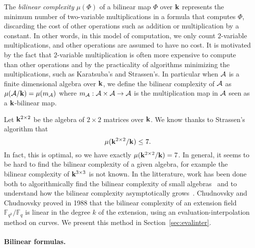 The \emph{bilinear complexity}
$\mu(\Phi)$ of a bilinear map $\Phi$ over $\mathbf{k}$ represents the minimum number of two-variable
multiplications in a formula that computes $\Phi$, discarding the cost of other
operations such as addition or multiplication by a constant. In other words, in
this model of computation, we only count $2$-variable multiplications, and other
operations are assumed to have no cost. It is motivated by the fact that
$2$-variable multiplication is often more expensive to compute than other
operations and by the practicality of algorithms minimizing the multiplications,
such as Karatsuba's and Strassen's.
In particular when $\mathcal{A}$ is a finite dimensional algebra over $\mathbf{k}$,
we define the bilinear complexity of $\mathcal{A}$ as $\mu(\mathcal{A}/\mathbf{k})=\mu(m_{\mathcal{A}})$
where $m_{\mathcal{A}}:\mathcal{A}\times\mathcal{A}\to\mathcal{A}$ is the multiplication map in $\mathcal{A}$ seen
as a $\mathbf{k}$-bilinear map.

Let $\mathbf{k}^{2\times2}$ be the algebra
of $2\times2$ matrices over $\mathbf{k}$. We know thanks to Strassen's algorithm that
\[
  \mu(\mathbf{k}^{2\times 2}/\mathbf{k}) \leq 7.
\]
In fact, this is optimal, so we have exactly $\mu(\mathbf{k}^{2\times2}/\mathbf{k})=7$. In
general, it seems to be hard to find the bilinear complexity of a given algebra,
for example the bilinear complexity of $\mathbf{k}^{3\times3}$ is not known.
In the litterature, work has been done both to algorithmically find the bilinear complexity of
small algebras~\cite{BDEZ12, Covanov19} and to understand how the bilinear
complexity asymptotically grows~\cite{CC88, BCPRRR19}. Chudnovsky and Chudnovsky
proved in 1988 that the bilinear complexity of an extension field
$\mathbb{F}_{q^k}/\mathbb{F}_{q}$ is linear in the degree $k$ of the
extension, using an evaluation-interpolation method on curves. We present this
method in Section~\ref{sec:evalinter}.

\paragraph{Bilinear formulas.}

